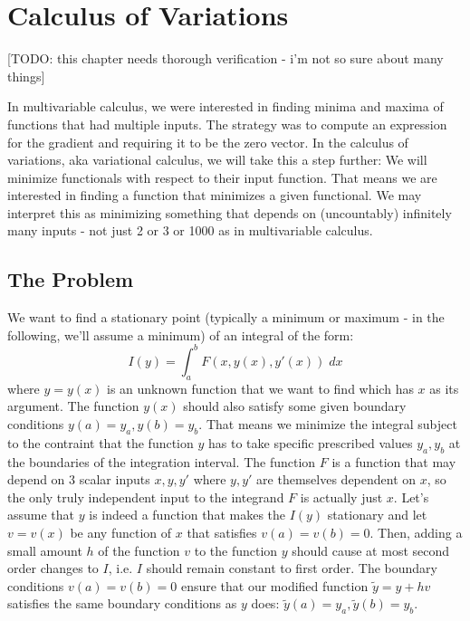 \section{Calculus of Variations} 

[TODO: this chapter needs thorough verification - i'm not so sure about many things]

In multivariable calculus, we were interested in finding minima and maxima of functions that had multiple inputs. The strategy was to compute an expression for the gradient and requiring it to be the zero vector. In the calculus of variations, aka variational calculus, we will take this a step further: We will minimize functionals with respect to their input function. That means we are interested in finding a function that minimizes a given functional. We may interpret this as minimizing something that depends on (uncountably) infinitely many inputs - not just 2 or 3 or 1000 as in multivariable calculus.


\subsection{The Problem}
We want to find a stationary point (typically a minimum or maximum - in the following, we'll assume a minimum) of an integral of the form:
\begin{equation}
 I(y) = \int_a^b F(x,y(x),y'(x)) \; dx
\end{equation}
where $y = y(x)$ is an unknown function that we want to find which has $x$ as its argument. The function $y(x)$ should also satisfy some given boundary conditions $y(a) = y_a, y(b) = y_b$. That means we minimize the integral subject to the contraint that the function $y$ has to take specific prescribed values $y_a, y_b$ at the boundaries of the integration interval. The function $F$ is a function that may depend on 3 scalar inputs $x,y,y'$ where $y,y'$ are themselves dependent on $x$, so the only truly independent input to the integrand $F$ is actually just $x$. Let's assume that $y$ is indeed a function that makes the $I(y)$ stationary and let $v = v(x)$ be any function of $x$ that satisfies $v(a) = v(b) = 0$. Then, adding a small amount $h$ of the function $v$ to the function $y$ should cause at most second order changes to $I$, i.e. $I$ should remain constant to first order. The boundary conditions $v(a) = v(b) = 0$ ensure that our modified function $\tilde{y} = y + h v$ satisfies the same boundary conditions as $y$ does: $\tilde{y}(a) = y_a, \tilde{y}(b) = y_b$.

